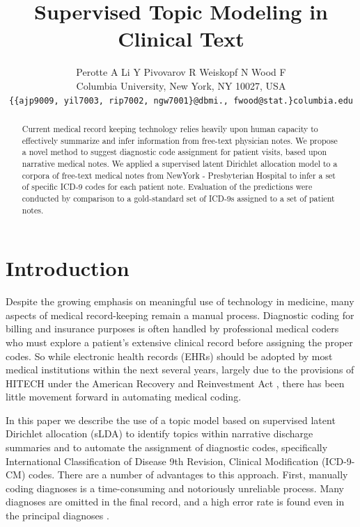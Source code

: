 \documentclass{article}
\title{Supervised Topic Modeling in Clinical Text}
\author{
Perotte A\hspace{1cm} Li Y \hspace{1cm} Pivovarov R \hspace{1cm} Weiskopf N\hspace{1cm} Wood F\\
Columbia University, New York, NY 10027, USA \\
\texttt{\{\{ajp9009, yil7003, rip7002, ngw7001\}@dbmi., fwood@stat.\}columbia.edu}
}
\begin{document}
\maketitle

\begin{abstract}
Current medical record keeping technology relies heavily upon human capacity to effectively summarize and infer information from free-text physician notes.  We propose a novel method to suggest diagnostic code assignment for patient visits, based upon narrative medical notes.  We applied a supervised latent Dirichlet allocation model to a corpora of free-text medical notes from NewYork - Presbyterian Hospital to infer a set of specific ICD-9 codes for each patient note.  Evaluation of the predictions were conducted by comparison to a gold-standard set of ICD-9s assigned to a set of patient notes.
\end{abstract}


\section{Introduction}
\label{sec:introduction}
Despite the growing emphasis on meaningful use of technology in medicine, many aspects of medical record-keeping remain a manual process.  Diagnostic coding for billing and insurance purposes is often handled by professional medical coders who must explore a patient's extensive clinical record before assigning the proper codes.  So while electronic health records (EHRs) should be adopted by most medical institutions within the next several years, largely due to the provisions of HITECH under the American Recovery and Reinvestment Act \citep{Blumenthal2009}, there has been little movement forward in automating medical coding.  

In this paper we describe the use of a topic model based on supervised latent Dirichlet allocation (sLDA) to identify topics within narrative discharge summaries and to automate the assignment of diagnostic codes, specifically International Classification of Disease 9th Revision, Clinical Modification (ICD-9-CM) codes.  There are a number of advantages to this approach.  First, manually coding diagnoses is a time-consuming and notoriously unreliable process.  Many diagnoses are omitted in the final record, and a high error rate is found even in the principal diagnoses \citep{Surjan1999}.
\end{document}
